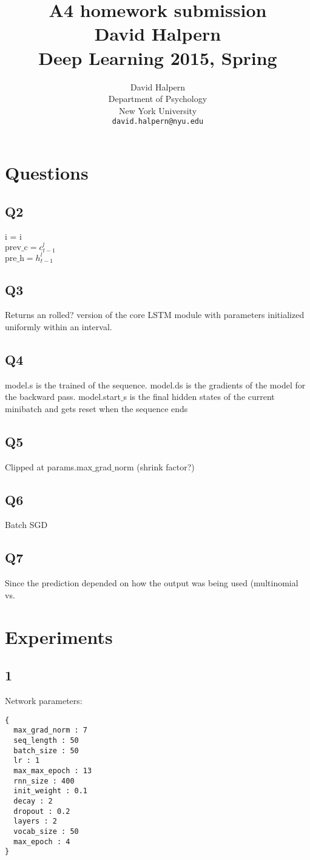 \documentclass{article} %
\title{A4 homework submission \\ David Halpern \\ Deep Learning 2015, Spring}
\author{
David Halpern\\
Department of Psychology\\
New York University\\
\texttt{david.halpern@nyu.edu} \\
}
\begin{document}
\maketitle


\section{Questions}

\subsection{Q2}

i = i\\
$\text{prev\_c} = c_{t-1}^l$\\
$\text{pre\_h} = h_{t-1}^l$

\subsection{Q3}
Returns an rolled? version of the core LSTM module with parameters initialized uniformly within an interval.

\subsection{Q4}
model.s is the trained of the sequence. model.ds is the gradients of the model for the backward pass. model.start$\_$s is the final hidden states of the current minibatch and gets reset when the sequence ends

\subsection{Q5}
Clipped at params.max$\_$grad$\_$norm (shrink factor?)

\subsection{Q6}
Batch SGD

\subsection{Q7}
Since the prediction depended on how the output was being used (multinomial vs.

\section{Experiments}
\subsection{1} 
Network parameters:	
\begin{Verbatim}
{
  max_grad_norm : 7
  seq_length : 50
  batch_size : 50
  lr : 1
  max_max_epoch : 13
  rnn_size : 400
  init_weight : 0.1
  decay : 2
  dropout : 0.2
  layers : 2
  vocab_size : 50
  max_epoch : 4
}
\end{Verbatim}
\end{document}
